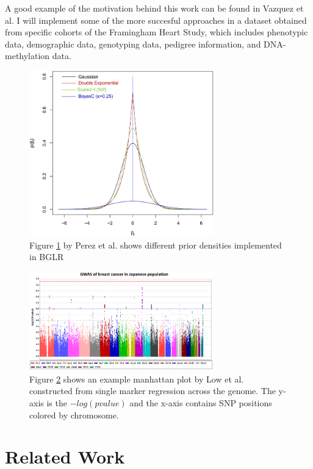 \documentclass{sig-alternate-05-2015}
\begin{document}
A good example of the motivation behind this work can be found in Vazquez et al. \cite{vazquez_increased_2016} I will implement some of the more succesful approaches in a dataset obtained from specific cohorts of the Framingham Heart Study,
which includes phenotypic data, demographic data, genotyping data, pedigree information, and DNA-methylation data.

\begin{figure}
  \includegraphics[width=8cm]{./Images/BGLR.jpg}
  \centering
  \caption{Figure \ref{fig:BGLR} by Perez et al.\cite{perez_genome-wide_2014} shows different prior densities implemented in BGLR}
  \label{fig:BGLR}
\end{figure}

\begin{figure}[h!]
  \includegraphics[width=8cm]{./Images/manhattan_plot.png}
  \centering
  \caption{Figure \ref{fig:manhattan1} shows an example manhattan plot by Low et al.\cite{low_genome-wide_2013} constructed from single marker regression across the genome. The y-axis is
  the $ -log(pvalue) $ and the x-axis contains SNP positions colored by chromosome.}
  \label{fig:manhattan1}
\end{figure}


\section{Related Work}
\end{document}
